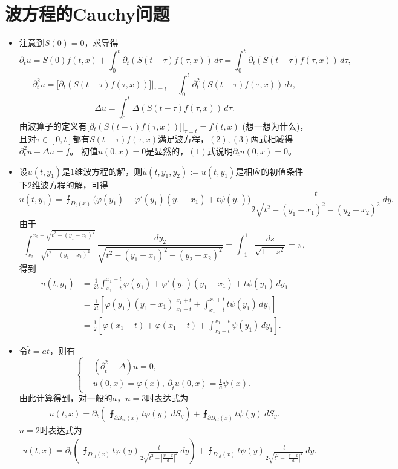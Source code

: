 \section{波方程的Cauchy问题}
\begin{itemize}
\item[1.] 注意到$S(0)=0$，求导得
\[\partial_tu=S(0)f(t,x)+\int_0^t\partial_t(S(t-\tau)f(\tau,x))\,d\tau=\int_0^t\partial_t(S(t-\tau)f(\tau,x))\,d\tau,\tag{1}\]
\[\partial^2_tu=\big[\partial_t(S(t-\tau)f(\tau,x))\big]\big|_{\tau=t}
+\int_0^t\partial_t^2(S(t-\tau)f(\tau,x))\,d\tau,\tag{2}\]
\[\Delta u=\int_0^t\Delta(S(t-\tau)f(\tau,x))\,d\tau.\tag{3}\]
由波算子的定义有$\big[\partial_t(S(t-\tau)f(\tau,x))\big]\big|_{\tau=t}=f(t,x)$ (想一想为什么)，
且对$\tau\in[0,t]$都有$S(t-\tau)f(\tau,x)$满足波方程，$(2),(3)$两式相减得$\partial_t^2u-\Delta u=f$。
初值$u(0,x)=0$是显然的，$(1)$式说明$\partial_tu(0,x)=0$。

\item[3.] 设$u(t,y_1)$是$1$维波方程的解，则$\tilde{u}(t,y_1,y_2):=u(t,y_1)$是相应的初值条件下$2$维波方程的解，可得
\[u(t,y_1)=\intbar_{\!\!\!D_{t}(x)}\big(\varphi(y_1)+\varphi'(y_1)(y_1-x_1)+t\psi(y_1)\big)\frac{t}{2\sqrt{t^2-(y_1-x_1)^2-(y_2-x_2)^2}}\,dy.\]
由于
\[\int_{x_2-\sqrt{t^2-(y_1-x_1)^2}}^{x_2+\sqrt{t^2-(y_1-x_1)^2}}\frac{dy_2}{\sqrt{t^2-(y_1-x_1)^2-(y_2-x_2)^2}}=\int_{-1}^{1}\frac{ds}{\sqrt{1-s^2}}=\pi,\]
得到
\begin{align*}
    u(t,y_1)&=\frac{1}{2t}\int_{x_1-t}^{x_1+t}\varphi(y_1)+\varphi'(y_1)(y_1-x_1)+t\psi(y_1)\,dy_1\\
    &=\frac{1}{2t}\left[\varphi(y_1)(y_1-x_1)\big|_{x_1-t}^{x_1+t}+\int_{x_1-t}^{x_1+t}t\psi(y_1)\,dy_1\right]\\
    &=\frac{1}{2}\left[\varphi(x_1+t)+\varphi(x_1-t)+\int_{x_1-t}^{x_1+t}\psi(y_1)\,dy_1\right].
\end{align*}

\item[4.] 令$\tilde{t}=at$，则有\begin{equation*}
    \left\{\begin{aligned}
&(\partial^2_{\tilde{t}}-\Delta)u=0,\\
&u(0,x)=\varphi(x),\ \partial_{\tilde{t}}u(0,x)=\frac{1}{a}\psi(x).
\end{aligned}\right.
\end{equation*}
由此计算得到，对一般的$a$，$n=3$时表达式为
\begin{align*}u(t,x)=\partial_t\left(\ \intbar_{\!\!\!\partial B_{at}(x)}t\varphi(y)\>dS_y\right)
+\intbar_{\!\!\!\partial B_{at}(x)}t\psi(y)\>dS_y.\end{align*}
$n=2$时表达式为
\begin{align*}u(t,x)=\partial_t\left(\ \intbar_{\!\!\!D_{at}(x)}t\varphi(y)\frac{t}{2\sqrt{t^2-|\frac{y-x}{a}|^2}}\>dy\right)
+\intbar_{\!\!\!D_{at}(x)}t\psi(y)\frac{t}{2\sqrt{t^2-|\frac{y-x}{a}|^2}}\>dy.\end{align*}


\end{itemize}
